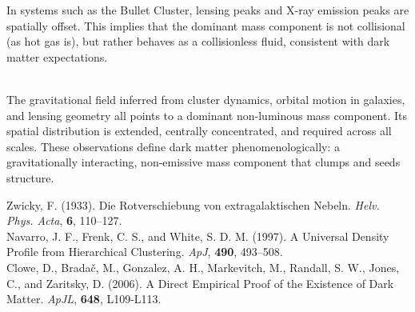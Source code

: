 \begin{technical}
In systems such as the Bullet Cluster, lensing peaks and X-ray emission peaks are spatially offset. This implies that the dominant mass component is not collisional (as hot gas is), but rather behaves as a collisionless fluid, consistent with dark matter expectations.

\\[0.25em]
The gravitational field inferred from cluster dynamics, orbital motion in galaxies, and lensing geometry all points to a dominant non-luminous mass component. Its spatial distribution is extended, centrally concentrated, and required across all scales. These observations define dark matter phenomenologically: a gravitationally interacting, non-emissive mass component that clumps and seeds structure.

\techref
{\footnotesize
Zwicky, F. (1933). Die Rotverschiebung von extragalaktischen Nebeln. \textit{Helv. Phys. Acta}, \textbf{6}, 110–127.\\
Navarro, J. F., Frenk, C. S., and White, S. D. M. (1997). A Universal Density Profile from Hierarchical Clustering. \textit{ApJ}, \textbf{490}, 493–508.\\
Clowe, D., Brada\v{c}, M., Gonzalez, A. H., Markevitch, M., Randall, S. W., Jones, C., and Zaritsky, D. (2006). A Direct Empirical Proof of the Existence of Dark Matter. \textit{ApJL}, \textbf{648}, L109-L113.
}
\end{technical}
